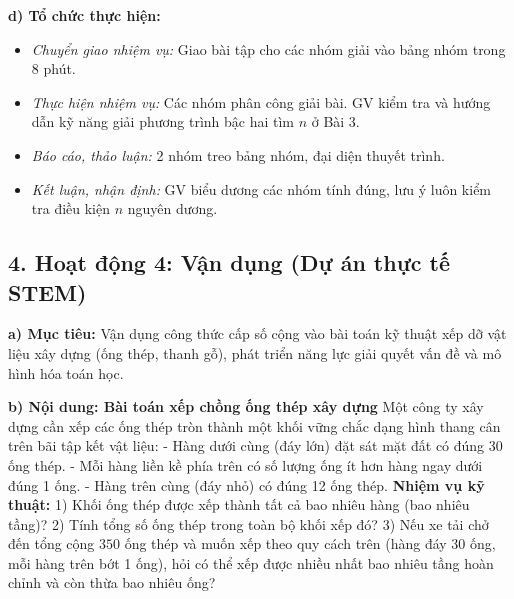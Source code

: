 \documentclass[12pt, a4paper]{article}
\begin{document}
\noindent \textbf{d) Tổ chức thực hiện:}  
\begin{itemize}[leftmargin=0.8cm]  
    \item \textit{Chuyển giao nhiệm vụ:} Giao bài tập cho các nhóm giải vào bảng nhóm trong 8 phút.  
    \item \textit{Thực hiện nhiệm vụ:} Các nhóm phân công giải bài. GV kiểm tra và hướng dẫn kỹ năng giải phương trình bậc hai tìm $n$ ở Bài 3.  
    \item \textit{Báo cáo, thảo luận:} 2 nhóm treo bảng nhóm, đại diện thuyết trình.  
    \item \textit{Kết luận, nhận định:} GV biểu dương các nhóm tính đúng, lưu ý luôn kiểm tra điều kiện $n$ nguyên dương.  
\end{itemize}  
  
\subsection*{4. Hoạt động 4: Vận dụng (Dự án thực tế STEM)}  
  
\noindent \textbf{a) Mục tiêu:}  
Vận dụng công thức cấp số cộng vào bài toán kỹ thuật xếp dỡ vật liệu xây dựng (ống thép, thanh gỗ), phát triển năng lực giải quyết vấn đề và mô hình hóa toán học.  
  
\noindent \textbf{b) Nội dung: Bài toán xếp chồng ống thép xây dựng}  
Một công ty xây dựng cần xếp các ống thép tròn thành một khối vững chắc dạng hình thang cân trên bãi tập kết vật liệu:  
- Hàng dưới cùng (đáy lớn) đặt sát mặt đất có đúng 30 ống thép.  
- Mỗi hàng liền kề phía trên có số lượng ống ít hơn hàng ngay dưới đúng 1 ống.  
- Hàng trên cùng (đáy nhỏ) có đúng 12 ống thép.  
\textbf{Nhiệm vụ kỹ thuật:}  
1) Khối ống thép được xếp thành tất cả bao nhiêu hàng (bao nhiêu tầng)?  
2) Tính tổng số ống thép trong toàn bộ khối xếp đó?  
3) Nếu xe tải chở đến tổng cộng $350$ ống thép và muốn xếp theo quy cách trên (hàng đáy 30 ống, mỗi hàng trên bớt 1 ống), hỏi có thể xếp được nhiều nhất bao nhiêu tầng hoàn chỉnh và còn thừa bao nhiêu ống?  
  
\end{document}
